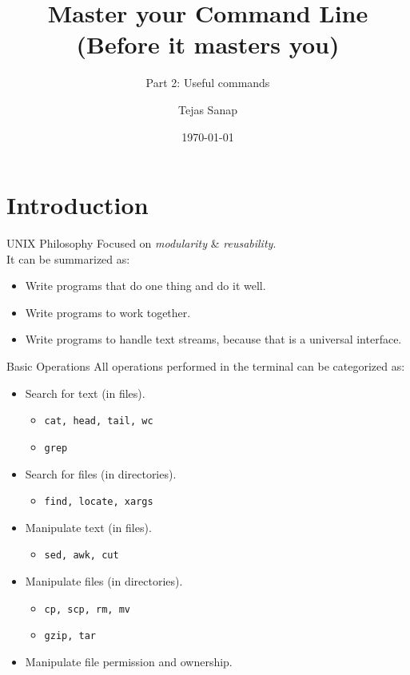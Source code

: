 \documentclass[11pt]{beamer}
\title[PLUG Meetup]{Master your Command Line \\ \small{(Before it masters you)} }
\subtitle{\large{Part 2: Useful commands}}
\author{Tejas Sanap}
\date{\today}
\begin{document}
	\begin{frame}
		\titlepage
	\end{frame}
	\begin{frame}
		\tableofcontents
	\end{frame}

	\section{Introduction}
		\begin{frame}{UNIX Philosophy}
			Focused on \emph{modularity} \& \emph{reusability}. \\
			It can be summarized as:
			\begin{itemize}
				\item Write programs that do one thing and do it well.
				\item Write programs to work together.
				\item Write programs to handle text streams, because that is a universal interface.
			\end{itemize}
		\end{frame}

		\begin{frame}{Basic Operations}
			All operations performed in the terminal can be categorized as:
			\begin{itemize}
				\item Search for text (in files).
					\begin{itemize}
						\item \texttt{cat, head, tail, wc}
						\item \texttt{grep}
					\end{itemize}
				\item Search for files (in directories).
					\begin{itemize}
						\item \texttt{find, locate, xargs}
					\end{itemize}
				\item Manipulate text (in files).
					\begin{itemize}
						\item \texttt{sed, awk, cut}
					\end{itemize}
				\item Manipulate files (in directories).
					\begin{itemize}
						\item \texttt{cp, scp, rm, mv}
						\item \texttt{gzip, tar}
					\end{itemize}
				\item Manipulate file permission and ownership.
			\end{itemize}			
		\end{frame}
\end{document}
